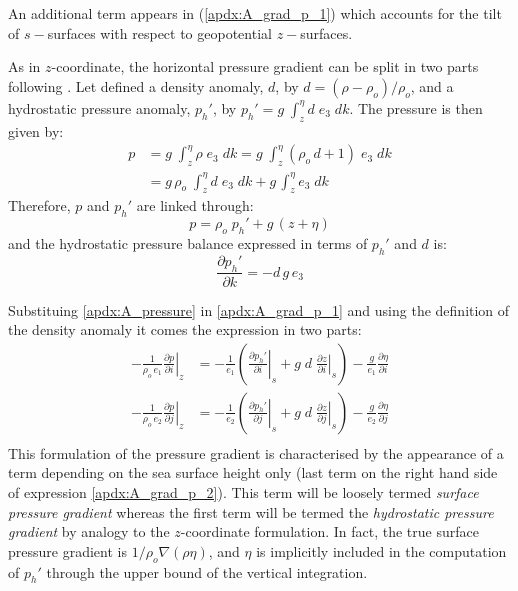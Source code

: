 \documentclass[../main/NEMO_manual]{subfiles}
\begin{document}
An additional term appears in (\autoref{apdx:A_grad_p_1}) which accounts for
the tilt of $s-$surfaces with respect to geopotential $z-$surfaces.

As in $z$-coordinate,
the horizontal pressure gradient can be split in two parts following \citet{Marsaleix_al_OM08}.
Let defined a density anomaly, $d$, by $d=(\rho - \rho_o)/ \rho_o$,
and a hydrostatic pressure anomaly, $p_h'$, by $p_h'= g \; \int_z^\eta d \; e_3 \; dk$.
The pressure is then given by:
\[
  \begin{split}
    p &= g\; \int_z^\eta \rho \; e_3 \; dk = g\; \int_z^\eta \left(  \rho_o \, d + 1 \right) \; e_3 \; dk   \\
    &= g \, \rho_o \; \int_z^\eta d \; e_3 \; dk + g \, \int_z^\eta e_3 \; dk
  \end{split}
\]
Therefore, $p$ and $p_h'$ are linked through:
\begin{equation}
  \label{apdx:A_pressure}
  p = \rho_o \; p_h' + g \, ( z + \eta )
\end{equation}
and the hydrostatic pressure balance expressed in terms of $p_h'$ and $d$ is:
\[
  \frac{\partial p_h'}{\partial k} = - d \, g \, e_3
\]

Substituing \autoref{apdx:A_pressure} in \autoref{apdx:A_grad_p_1} and
using the definition of the density anomaly it comes the expression in two parts:
\begin{equation}
  \label{apdx:A_grad_p_2}
  \begin{split}
    -\frac{1}{\rho_o \, e_1 } \left. {\frac{\partial p}{\partial i}} \right|_z
    &=-\frac{1}{e_1 } \left(     \left.              {\frac{\partial p_h'}{\partial i}} \right|_s
      + g\; d  \;\left. {\frac{\partial z}{\partial i}} \right|_s    \right)  - \frac{g}{e_1 } \frac{\partial \eta}{\partial i} \\
    -\frac{1}{\rho_o \, e_2 }\left. {\frac{\partial p}{\partial j}} \right|_z
    &=-\frac{1}{e_2 } \left(    \left.               {\frac{\partial p_h'}{\partial j}} \right|_s
      + g\; d \;\left. {\frac{\partial z}{\partial j}} \right|_s   \right)  - \frac{g}{e_2 } \frac{\partial \eta}{\partial j}\\
  \end{split}
\end{equation}
This formulation of the pressure gradient is characterised by the appearance of
a term depending on the sea surface height only
(last term on the right hand side of expression \autoref{apdx:A_grad_p_2}).
This term will be loosely termed \textit{surface pressure gradient} whereas
the first term will be termed the \textit{hydrostatic pressure gradient} by analogy to
the $z$-coordinate formulation.
In fact, the true surface pressure gradient is $1/\rho_o \nabla (\rho \eta)$,
and $\eta$ is implicitly included in the computation of $p_h'$ through the upper bound of the vertical integration.
\end{document}
